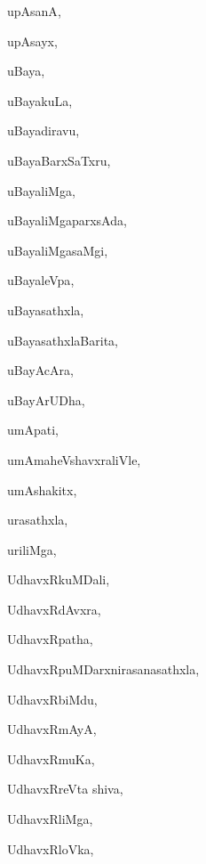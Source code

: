 \begin{multicols}{3}
{\noindent
{upAsanA}, \pageref{upAsanA}

\noindent
{upAsayx}, \pageref{upAsayx}

\noindent
{uBaya}, \pageref{uBaya}

\noindent
{uBayakuLa}, \pageref{uBayakuLa}

\noindent
{uBayadiravu}, \pageref{uBayadiravu}

\noindent
{uBayaBarxSaTxru}, \pageref{uBayaBarxSaTxru}

\noindent
{uBayaliMga}, \pageref{uBayaliMga}

\noindent
{uBayaliMgaparxsAda}, \pageref{uBayaliMgaparxsAda}

\noindent
{uBayaliMgasaMgi}, \pageref{uBayaliMgasaMgi}

\noindent
{uBayaleVpa}, \pageref{uBayaleVpa}

\noindent
{uBayasathxla}, \pageref{uBayasathxla}

\noindent
{uBayasathxlaBarita}, \pageref{uBayasathxlaBarita}

\noindent
{uBayAcAra}, \pageref{uBayAcAra}

\noindent
{uBayArUDha}, \pageref{uBayArUDha}

\noindent
{umApati}, \pageref{umApati}

\noindent
{umAmaheVshavxraliVle}, \pageref{umAmaheVshavxraliVle}

\noindent
{umAshakitx}, \pageref{umAshakitx}

\noindent
{urasathxla}, \pageref{urasathxla}

\noindent
{uriliMga}, \pageref{uriliMga}

\noindent
{UdhavxRkuMDali}, \pageref{UdhavxRkuMDali}

\noindent
{UdhavxRdAvxra}, \pageref{UdhavxRdAvxra}

\noindent
{UdhavxRpatha}, \pageref{UdhavxRpatha}

\noindent
{UdhavxRpuMDarxnirasanasathxla}, \pageref{UdhavxRpuMDarxnirasanasathxla}

\noindent
{UdhavxRbiMdu}, \pageref{UdhavxRbiMdu}

\noindent
{UdhavxRmAyA}, \pageref{UdhavxRmAyA}

\noindent
{UdhavxRmuKa}, \pageref{UdhavxRmuKa}

\noindent
{UdhavxRreVta shiva}, \pageref{UdhavxRreVta shiva}

\noindent
{UdhavxRliMga}, \pageref{UdhavxRliMga}

\noindent
{UdhavxRloVka}, \pageref{UdhavxRloVka}

}
\end{multicols}
